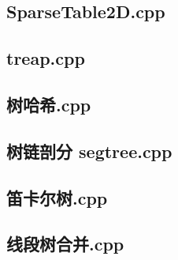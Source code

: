 \subsection{SparseTable2D.cpp}


\subsection{treap.cpp}


\subsection{树哈希.cpp}


\subsection{树链剖分 segtree.cpp}


\subsection{笛卡尔树.cpp}


\subsection{线段树合并.cpp}


